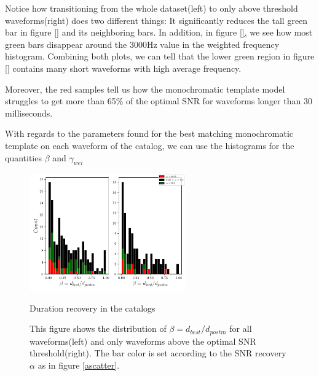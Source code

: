 Notice how transitioning from the whole dataset(left) to only above threshold waveforms(right) does two different things: It significantly reduces the tall green bar in figure \ref{}  and its neighboring bars. In addition, in figure \ref{}, we see how most green bars disappear around the 3000Hz value in the weighted frequency histogram. Combining both plots, we can tell that the lower green region in figure \ref{} contains many short waveforms with high average frequency.

Moreover, the red samples tell us how the monochromatic template model struggles to get more than 65\% of the optimal SNR for waveforms longer than 30 milliseconds. 


\newpage 

With regards to the parameters found for the best matching monochromatic template on each waveform of the catalog, we can use the histograms for the quantities  $\beta$ and $\gamma_{wei}$ 

\begin{figure}[hbt!]
\begin{center}
\includegraphics[width=0.6\textwidth, angle=0]{images/Data_analysis/results/alpha_betahist.pdf}
\captionsetup{width=0.8\textwidth}
\caption{Duration recovery in the catalogs}
\caption*{This figure shows the distribution of $\beta=d_{best}/d_{postm}$ for all waveforms(left) and only waveforms above the optimal SNR threshold(right). The bar color is set according to the SNR recovery $\alpha$ as in figure \ref{ascatter}.}
\label{abhist}
\end{center}
\end{figure}

